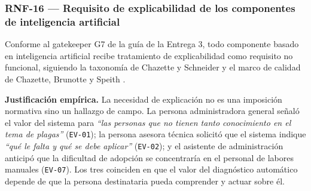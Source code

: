 \documentclass[11pt,a4paper]{article}
\newcommand{\id}[1]{\texttt{\begingroup\hyphenpenalty=10000\relax#1\endgroup}}
\renewcommand{\id}[1]{\texttt{#1}}
\begin{document}
\subsubsection{RNF-16 --- Requisito de explicabilidad de los componentes de inteligencia artificial}

Conforme al gatekeeper G7 de la guía de la Entrega 3, todo componente basado en inteligencia
artificial recibe tratamiento de explicabilidad como requisito no funcional, siguiendo la taxonomía
de Chazette y Schneider \cite{chazette2020} y el marco de calidad de Chazette, Brunotte y Speith
\cite{chazette2021,chazette2022}.

\textbf{Justificación empírica.} La necesidad de explicación no es una imposición normativa sino un
hallazgo de campo. La persona administradora general señaló el valor del sistema para
\emph{``las personas que no tienen tanto conocimiento en el tema de plagas''} (\id{EV-01}); la
persona asesora técnica solicitó que el sistema indique \emph{``qué le falta y qué se debe
aplicar''} (\id{EV-02}); y el asistente de administración anticipó que la dificultad de adopción se
concentraría en el personal de labores manuales (\id{EV-07}). Los tres coinciden en que el valor del
diagnóstico automático depende de que la persona destinataria pueda comprender y actuar sobre él.
\end{document}

